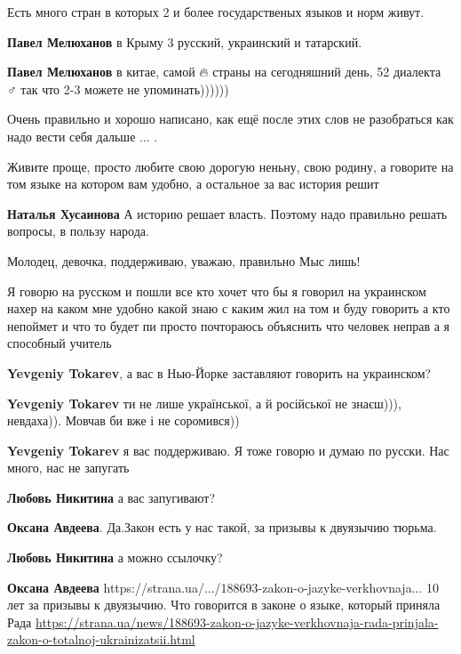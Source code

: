 \begin{itemize}
{
Есть много стран в которых 2 и более государственых языков и норм живут.

\textbf{Павел Мелюханов} в Крыму 3 русский, украинский и татарский.

\textbf{Павел Мелюханов} в китае, самой 🔥 страны на сегодняшний день, 52
диалекта 🤷♂️ так что 2-3 можете не упоминать))))))

Очень правильно и хорошо написано, как ещё после этих слов не разобраться как
надо вести себя дальше ... .


Живите проще, просто любите свою дорогую неньну, свою родину, а говорите на том
языке на котором вам удобно, а остальное за вас история решит

\textbf{Наталья Хусаинова} А историю решает власть. Поэтому надо правильно
решать вопросы, в пользу народа.


Молодец, девочка, поддерживаю, уважаю, правильно Мыс лишь!


Я говорю на русском и пошли все кто хочет что бы я говорил на украинском нахер
на каком мне удобно какой знаю с каким жил на том и буду говорить а кто
непоймет и что то будет пи просто почтораюсь объяснить что человек неправ а я
способный учитель

\begin{itemize}
\textbf{Yevgeniy Tokarev}, а вас в Нью-Йорке заставляют говорить на украинском?

\textbf{Yevgeniy Tokarev} ти не лише української, а й російської не знаєш))), невдаха)). Мовчав би вже і не соромився))

\textbf{Yevgeniy Tokarev} я вас поддерживаю. Я тоже говорю и думаю по русски. Нас много, нас не запугать

\textbf{Любовь Никитина} а вас запугивают?

\textbf{Оксана Авдеева}. Да.Закон есть у нас такой, за призывы к двуязычию тюрьма.

\textbf{Любовь Никитина} а можно ссылочку?

\textbf{Оксана Авдеева} https://strana.ua/.../188693-zakon-o-jazyke-verkhovnaja...
10 лет за призывы к двуязычию. Что говорится в законе о языке, который приняла Рада
\url{https://strana.ua/news/188693-zakon-o-jazyke-verkhovnaja-rada-prinjala-zakon-o-totalnoj-ukrainizatsii.html}


\end{itemize}}
\end{itemize}
